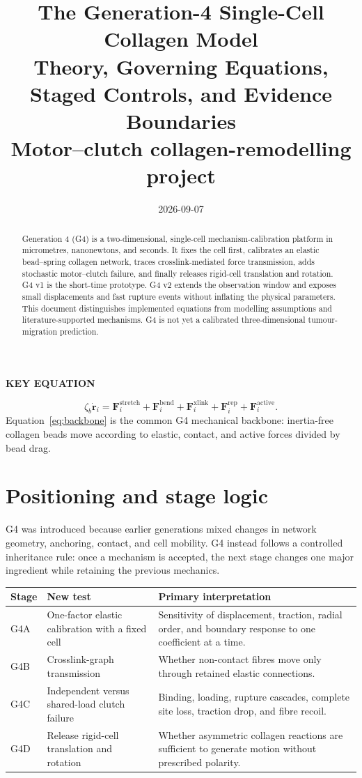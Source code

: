 \documentclass[10.5pt]{article}
\title{\vspace{-1.2cm}\textbf{The Generation-4 Single-Cell Collagen Model}\\[3pt]
\large Theory, Governing Equations, Staged Controls, and Evidence Boundaries\\[6pt]
\normalsize\textnormal{Motor--clutch collagen-remodelling project}}
\author{}
\date{2026-09-07}
\newcommand{\rv}{\mathbf r}
\newcommand{\Fv}{\mathbf F}
\newcommand{\keylabel}{\par\smallskip\noindent\textcolor{g4}{\textbf{KEY EQUATION}}\par\vspace{-5pt}}
\begin{document}
\maketitle
\vspace{-1cm}

\begin{abstract}
Generation 4 (G4) is a two-dimensional, single-cell mechanism-calibration platform in
micrometres, nanonewtons, and seconds. It fixes the cell first, calibrates an elastic
bead--spring collagen network, traces crosslink-mediated force transmission, adds stochastic
motor--clutch failure, and finally releases rigid-cell translation and rotation. G4 v1 is the
short-time prototype. G4 v2 extends the observation window and exposes small displacements and
fast rupture events without inflating the physical parameters. This document distinguishes
implemented equations from modelling assumptions and literature-supported mechanisms. G4 is not
yet a calibrated three-dimensional tumour-migration prediction.
\end{abstract}

\keylabel
\begin{equation}
 \zeta_b\dot{\rv}_i=
 \Fv_i^{\mathrm{stretch}}+\Fv_i^{\mathrm{bend}}+\Fv_i^{\mathrm{xlink}}
 +\Fv_i^{\mathrm{rep}}+\Fv_i^{\mathrm{active}} .
 \label{eq:backbone}
\end{equation}
Equation~\eqref{eq:backbone} is the common G4 mechanical backbone: inertia-free collagen beads
move according to elastic, contact, and active forces divided by bead drag.

\tableofcontents

\section{Positioning and stage logic}

G4 was introduced because earlier generations mixed changes in network geometry, anchoring,
contact, and cell mobility. G4 instead follows a controlled inheritance rule: once a mechanism is
accepted, the next stage changes one major ingredient while retaining the previous mechanics.

\begin{longtable}{>{\raggedright\arraybackslash}p{}p{}p{}}
\toprule
Stage & New test & Primary interpretation \\
\midrule
G4A & One-factor elastic calibration with a fixed cell & Sensitivity of displacement, traction,
radial order, and boundary response to one coefficient at a time. \\
G4B & Crosslink-graph transmission & Whether non-contact fibres move only through retained
elastic connections. \\
G4C & Independent versus shared-load clutch failure & Binding, loading, rupture cascades,
complete site loss, traction drop, and fibre recoil. \\
G4D & Release rigid-cell translation and rotation & Whether asymmetric collagen reactions are
sufficient to generate motion without prescribed polarity. \\
\bottomrule
\end{longtable}
\end{document}
